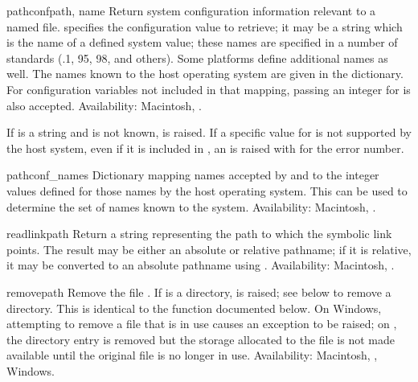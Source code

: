 \begin{funcdesc}{pathconf}{path, name}
Return system configuration information relevant to a named file.
 specifies the configuration value to retrieve; it may be a
string which is the name of a defined system value; these names are
specified in a number of standards (\POSIX.1, \UNIX{} 95, \UNIX{} 98, and
others).  Some platforms define additional names as well.  The names
known to the host operating system are given in the
 dictionary.  For configuration variables not
included in that mapping, passing an integer for  is also
accepted.
Availability: Macintosh, \UNIX.

If  is a string and is not known,  is
raised.  If a specific value for  is not supported by the
host system, even if it is included in , an
 is raised with  for the
error number.
\end{funcdesc}

\begin{datadesc}{pathconf_names}
Dictionary mapping names accepted by  and
 to the integer values defined for those names
by the host operating system.  This can be used to determine the set
of names known to the system.
Availability: Macintosh, \UNIX.
\end{datadesc}

\begin{funcdesc}{readlink}{path}
Return a string representing the path to which the symbolic link
points.  The result may be either an absolute or relative pathname; if
it is relative, it may be converted to an absolute pathname using
.
Availability: Macintosh, \UNIX.
\end{funcdesc}

\begin{funcdesc}{remove}{path}
Remove the file .  If  is a directory,
 is raised; see  below to remove
a directory.  This is identical to the  function
documented below.  On Windows, attempting to remove a file that is in
use causes an exception to be raised; on \UNIX, the directory entry is
removed but the storage allocated to the file is not made available
until the original file is no longer in use.
Availability: Macintosh, \UNIX, Windows.
\end{funcdesc}

